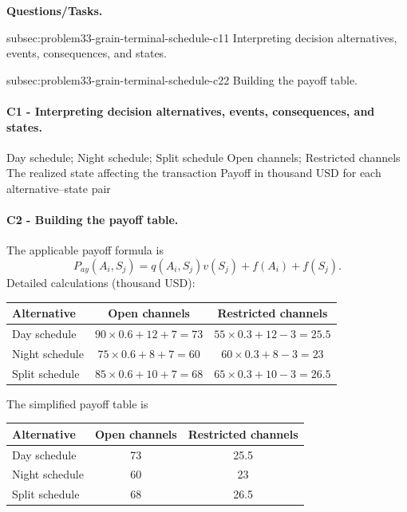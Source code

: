 	\textbf{Questions/Tasks.}
	\begin{enumerate}
	\CriterionTask
	{subsec:problem33-grain-terminal-schedule-c1}{1}
	{Interpreting decision alternatives, events, consequences, and states.}

	\CriterionTask
	{subsec:problem33-grain-terminal-schedule-c2}{2}
	{Building the payoff table.}
	\end{enumerate}

	\paragraph*{C1 - Interpreting decision alternatives, events, consequences, and states.}
	\label{subsec:problem33-grain-terminal-schedule-c1}
	\DecisionElementsTable
	{Day schedule; Night schedule; Split schedule}
	{Open channels; Restricted channels}
	{The realized state affecting the transaction}
	{Payoff in thousand USD for each alternative--state pair}

	\paragraph*{C2 - Building the payoff table.}
	\label{subsec:problem33-grain-terminal-schedule-c2}
	The applicable payoff formula is
	\[ P_{ay}(A_i,S_j)=q(A_i,S_j)v(S_j)+f(A_i)+f(S_j). \]
	Detailed calculations (thousand USD):
	\begin{center}\small
	\begin{tabular}{lcc}
	\toprule
	Alternative & Open channels & Restricted channels \\
	\midrule
	Day schedule & $90\times 0.6+12+7=73$ & $55\times 0.3+12-3=25.5$ \\
Night schedule & $75\times 0.6+8+7=60$ & $60\times 0.3+8-3=23$ \\
Split schedule & $85\times 0.6+10+7=68$ & $65\times 0.3+10-3=26.5$ \\
	\bottomrule
	\end{tabular}
	\end{center}
	The simplified payoff table is
	\begin{center}
	\begin{tabular}{lcc}
	\toprule
	Alternative & Open channels & Restricted channels \\
	\midrule
	Day schedule & 73 & 25.5 \\
Night schedule & 60 & 23 \\
Split schedule & 68 & 26.5 \\
	\bottomrule
	\end{tabular}
	\end{center}

